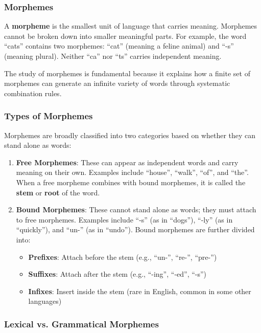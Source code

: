 \documentclass[11pt,a4paper]{article}
\begin{document}
\subsubsection{Morphemes}

A \textbf{morpheme} is the smallest unit of language that carries meaning. Morphemes cannot be broken down into smaller meaningful parts. For example, the word ``cats'' contains two morphemes: ``cat'' (meaning a feline animal) and ``-s'' (meaning plural). Neither ``ca'' nor ``ts'' carries independent meaning.

The study of morphemes is fundamental because it explains how a finite set of morphemes can generate an infinite variety of words through systematic combination rules.

\subsubsection{Types of Morphemes}

Morphemes are broadly classified into two categories based on whether they can stand alone as words:

\begin{enumerate}
    \item \textbf{Free Morphemes}: These can appear as independent words and carry meaning on their own. Examples include ``house'', ``walk'', ``of'', and ``the''. When a free morpheme combines with bound morphemes, it is called the \textbf{stem} or \textbf{root} of the word.
    \item \textbf{Bound Morphemes}: These cannot stand alone as words; they must attach to free morphemes. Examples include ``-s'' (as in ``dogs''), ``-ly'' (as in ``quickly''), and ``un-'' (as in ``undo''). Bound morphemes are further divided into:
    \begin{itemize}
        \item \textbf{Prefixes}: Attach before the stem (e.g., ``un-'', ``re-'', ``pre-'')
        \item \textbf{Suffixes}: Attach after the stem (e.g., ``-ing'', ``-ed'', ``-s'')
        \item \textbf{Infixes}: Insert inside the stem (rare in English, common in some other languages)
    \end{itemize}
\end{enumerate}

\subsubsection{Lexical vs. Grammatical Morphemes}
\end{document}
